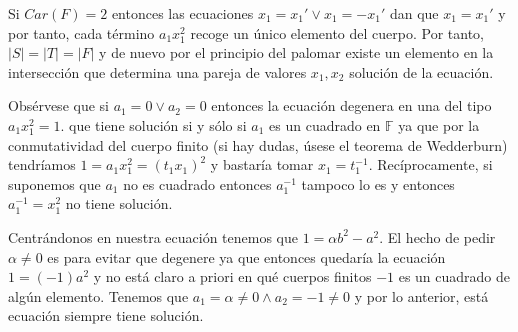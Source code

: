 \documentclass{article}
\theoremstyle{theorem-style}  %
\theoremstyle{definition-style}
\theoremstyle{example-style}
\begin{document}
Si $Car(F) = 2$ entonces las ecuaciones $x_1 = x_1' \lor x_1 = -x_1'$ dan que $x_1 = x_1'$ y por tanto, cada término $a_1x_1^2$ recoge un único elemento del cuerpo. Por tanto, $|S| = |T| = |F|$ y de nuevo por el principio del palomar existe un elemento en la intersección que determina una pareja de valores $x_1,x_2$ solución de la ecuación. 

Obsérvese que si $a_1 = 0 \lor a_2 = 0$ entonces la ecuación degenera en una del tipo $a_1 x_1^2 = 1$.  que tiene solución si y sólo si $a_1$ es un cuadrado en $\mathbb{F}$ ya que por la conmutatividad del cuerpo finito (si hay dudas, úsese el teorema de Wedderburn) tendríamos $1 = a_1x_1^2 = (t_1x_1)^2$ y bastaría tomar $x_1 = t_1^{-1}$. Recíprocamente, si suponemos que $a_1$ no es cuadrado entonces $a_1^{-1}$ tampoco lo es y entonces $a_1^{-1} = x_1^2$ no tiene solución. 

Centrándonos en nuestra ecuación tenemos que $1 = \alpha b^2  - a^2$. El hecho de pedir $\alpha \neq 0$ es para evitar que degenere ya que entonces quedaría la ecuación $1 = (-1)a^2$ y no está claro a priori en qué cuerpos finitos $-1$ es un cuadrado de algún elemento. Tenemos que $a_1 = \alpha \neq 0 \land a_2 = -1 \neq 0$ y por lo anterior, está ecuación siempre tiene solución. \begin{center}

\end{center} 

\printbibliography
\end{document}
